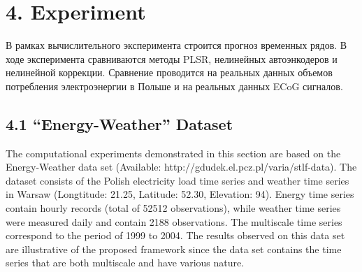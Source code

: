 \documentclass[12pt,twoside]{article}
\newcommand{\bx}{\mathbf{x}}
\newcommand{\bw}{\mathbf{w}}
\newcommand{\bX}{\mathbf{X}}
\newcommand{\br}{\mathbf{r}}
\begin{document}
	

\section{4. Experiment}
	В рамках вычислительного эксперимента строится прогноз временных рядов. В ходе эксперимента сравниваются методы PLSR, нелинейных автоэнкодеров и нелинейной коррекции. Сравнение проводится на реальных данных объемов потребления электроэнергии в Польше и на реальных данных ECoG сигналов. 

\subsection{4.1 ``Energy-Weather'' Dataset }
	The computational experiments demonstrated in this section are based on the Energy-Weather data set (Available: http://gdudek.el.pcz.pl/varia/stlf-data). The dataset consists of the Polish electricity load time series and weather time series in Warsaw (Longtitude: 21.25, Latitude: 52.30, Elevation: 94). Energy time series contain hourly records (total of 52512 observations), while weather time series were measured daily and contain 2188 observations. The multiscale time series correspond to the period of 1999 to 2004. The results observed on this data set are illustrative of the proposed framework since the data set contains the time series that are both multiscale and have various nature.
\end{document}
